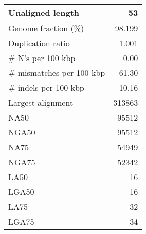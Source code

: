 \documentclass[12pt,a4paper]{article}
\begin{document}
\begin{table}[ht]
\begin{center}
\begin{tabular}{|l*{1}{|r}|}
Unaligned length & 53 \\ \hline
Genome fraction (\%) & 98.199 \\ \hline
Duplication ratio & 1.001 \\ \hline
\# N's per 100 kbp & 0.00 \\ \hline
\# mismatches per 100 kbp & 61.30 \\ \hline
\# indels per 100 kbp & 10.16 \\ \hline
Largest alignment & 313863 \\ \hline
NA50 & 95512 \\ \hline
NGA50 & 95512 \\ \hline
NA75 & 54949 \\ \hline
NGA75 & 52342 \\ \hline
LA50 & 16 \\ \hline
LGA50 & 16 \\ \hline
LA75 & 32 \\ \hline
LGA75 & 34 \\ \hline
\end{tabular}
\end{center}
\end{table}
\end{document}
